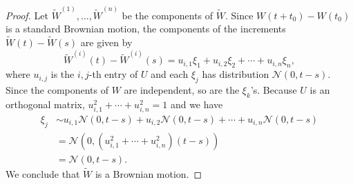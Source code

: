 \documentclass[11pt,letterpaper]{report}
\newcommand{\mcal}[1]{\mathcal{#1}}
\begin{document}
\begin{enumerate}
\begin{proof}
		\noindent Let $\tilde{W}^{(1)}, \ldots, \tilde{W}^{(n)}$ be the components of $\tilde{W}$. Since $W(t+t_0) - W(t_0)$ is a standard Brownian motion, the components of the increments $\tilde{W}(t) - \tilde{W}(s)$ are given by
		\[
		\tilde{W}^{(i)}(t)- \tilde{W}^{(i)}(s) = u_{i,1}\xi_1 + u_{i,2}\xi_2 + \cdots + u_{i,n}\xi_n,
		\]
		where $u_{i,j}$ is the $i,j$-th entry of $U$ and each $\xi_j$ has distribution $\mcal{N}(0, t-s)$. Since the components of $W$ are independent, so are the $\xi_k$'s. Because $U$ is an orthogonal matrix, $u_{i,1}^2 + \cdots +u_{i,n}^2 = 1$ and we have
		\begin{align*}
			\xi_j &\sim u_{i,1}\mcal{N}(0, t-s) + u_{i,2}\mcal{N}(0, t-s) + \cdots + u_{i,n}\mcal{N}(0, t-s)\\
			&= \mcal{N}(0, (u_{i,1}^2 + \cdots + u_{i,n}^2)(t-s))\\
			&= \mcal{N}(0, t-s).
		\end{align*}
		We conclude that $\tilde{W}$ is a Brownian motion.
	\end{proof}
\end{enumerate}
\end{document}
